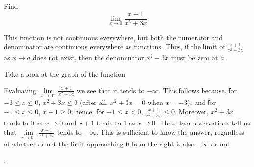 \documentclass{ximera}
\begin{document}
\begin{question}
  Find 
  \[
  \displaystyle \lim_{x\to0} \frac{x+1}{x^2+3x}
  \]
  \begin{solution}
    \begin{hint}
      This function is \underline{not} continuous everywhere, but both the numerator and denominator are continuous everywhere as functions. Thus, if the limit of $\frac{x+1}{x^2+3x}$ as $x\to a$ does not exist, then the denominator $x^2+3x$ must be zero at $a$.
    \end{hint}
     \begin{hint}
    Take a look at the graph of the function
    \begin{center}
      \end{center}
    \end{hint}
    \begin{hint}
     Evaluating $\lim\limits_{x\to0^{-}}\frac{x+1}{x^2+3x}$ we see that it tends to $-\infty$. This follows because, for $-3\le x\le0$, $x^2+3x\le0$ (after all, $x^2+3x=0$ when $x=-3$), and for $-1\le x\le0$, $x+1\ge0$; hence, for $-1\le x<0$, $\frac{x+1}{x^2+3x}\le0$. Moreover, $x^2+3x$ tends to $0$ as $x\to{0}$ and $x+1$ tends to $1$ as $x\to{0}$. These two observations tell us that  $\lim\limits_{x\to0^{-}}\frac{x+1}{x^2+3x}$ tends to $-\infty$. This is sufficient to know the answer, regardless of whether or not the limit approaching $0$ from the right is also $-\infty$ or not.
    \end{hint}
    .
  \end{solution}
\end{question}
\end{document}
